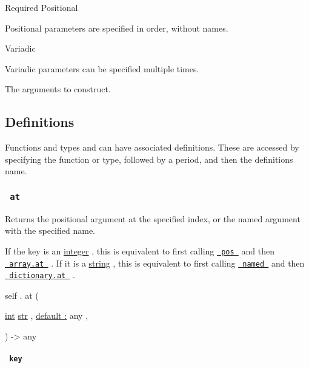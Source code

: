 {Required} {{ Positional }}

\label{constructor-arguments-positional-tooltip}
Positional parameters are specified in order, without names.

{{ Variadic }}

\label{constructor-arguments-variadic-tooltip}
Variadic parameters can be specified multiple times.

The arguments to construct.

\subsection{\texorpdfstring{{ Definitions
}}{ Definitions }}\label{definitions}

\label{definitions-tooltip}
Functions and types and can have associated definitions. These are
accessed by specifying the function or type, followed by a period, and
then the definition\textquotesingle s name.

\subsubsection{\texorpdfstring{\texttt{\ at\ }}{ at }}\label{definitions-at}

Returns the positional argument at the specified index, or the named
argument with the specified name.

If the key is an \href{/docs/reference/foundations/int/}{integer} , this
is equivalent to first calling
\href{/docs/reference/foundations/arguments/\#definitions-pos}{\texttt{\ pos\ }}
and then
\href{/docs/reference/foundations/array/\#definitions-at}{\texttt{\ array.at\ }}
. If it is a \href{/docs/reference/foundations/str/}{string} , this is
equivalent to first calling
\href{/docs/reference/foundations/arguments/\#definitions-named}{\texttt{\ named\ }}
and then
\href{/docs/reference/foundations/dictionary/\#definitions-at}{\texttt{\ dictionary.at\ }}
.

self { . } { at } (

{ \href{/docs/reference/foundations/int/}{int}
\href{/docs/reference/foundations/str/}{str} , } {
\hyperref[definitions-at-parameters-default]{default :} { any } , }

) -\textgreater{} { any }

\paragraph{\texorpdfstring{\texttt{\ key\ }}{ key }}\label{definitions-at-key}

